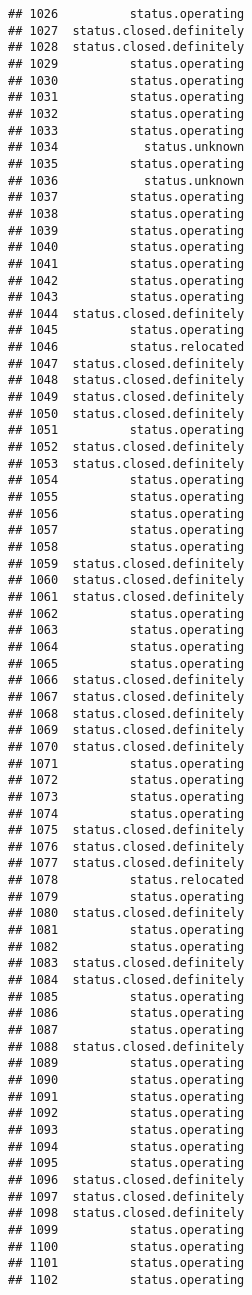 \documentclass[
]{article}
\begin{document}
\begin{verbatim}
## 1026          status.operating
## 1027  status.closed.definitely
## 1028  status.closed.definitely
## 1029          status.operating
## 1030          status.operating
## 1031          status.operating
## 1032          status.operating
## 1033          status.operating
## 1034            status.unknown
## 1035          status.operating
## 1036            status.unknown
## 1037          status.operating
## 1038          status.operating
## 1039          status.operating
## 1040          status.operating
## 1041          status.operating
## 1042          status.operating
## 1043          status.operating
## 1044  status.closed.definitely
## 1045          status.operating
## 1046          status.relocated
## 1047  status.closed.definitely
## 1048  status.closed.definitely
## 1049  status.closed.definitely
## 1050  status.closed.definitely
## 1051          status.operating
## 1052  status.closed.definitely
## 1053  status.closed.definitely
## 1054          status.operating
## 1055          status.operating
## 1056          status.operating
## 1057          status.operating
## 1058          status.operating
## 1059  status.closed.definitely
## 1060  status.closed.definitely
## 1061  status.closed.definitely
## 1062          status.operating
## 1063          status.operating
## 1064          status.operating
## 1065          status.operating
## 1066  status.closed.definitely
## 1067  status.closed.definitely
## 1068  status.closed.definitely
## 1069  status.closed.definitely
## 1070  status.closed.definitely
## 1071          status.operating
## 1072          status.operating
## 1073          status.operating
## 1074          status.operating
## 1075  status.closed.definitely
## 1076  status.closed.definitely
## 1077  status.closed.definitely
## 1078          status.relocated
## 1079          status.operating
## 1080  status.closed.definitely
## 1081          status.operating
## 1082          status.operating
## 1083  status.closed.definitely
## 1084  status.closed.definitely
## 1085          status.operating
## 1086          status.operating
## 1087          status.operating
## 1088  status.closed.definitely
## 1089          status.operating
## 1090          status.operating
## 1091          status.operating
## 1092          status.operating
## 1093          status.operating
## 1094          status.operating
## 1095          status.operating
## 1096  status.closed.definitely
## 1097  status.closed.definitely
## 1098  status.closed.definitely
## 1099          status.operating
## 1100          status.operating
## 1101          status.operating
## 1102          status.operating

\end{verbatim}
\end{document}
